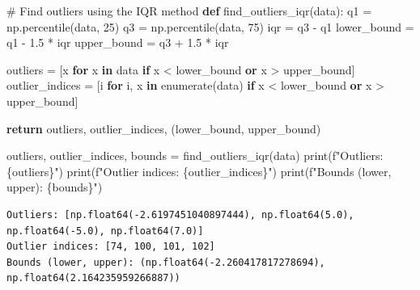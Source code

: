 \documentclass[
  letterpaper,
  DIV=11,
  numbers=noendperiod]{scrreprt}
\newenvironment{Shaded}{\begin{snugshade}}{\end{snugshade}}
\newcommand{\BuiltInTok}[1]{\textcolor[rgb]{0.00,0.23,0.31}{#1}}
\newcommand{\CommentTok}[1]{\textcolor[rgb]{0.37,0.37,0.37}{#1}}
\newcommand{\ControlFlowTok}[1]{\textcolor[rgb]{0.00,0.23,0.31}{\textbf{#1}}}
\newcommand{\DecValTok}[1]{\textcolor[rgb]{0.68,0.00,0.00}{#1}}
\newcommand{\FloatTok}[1]{\textcolor[rgb]{0.68,0.00,0.00}{#1}}
\newcommand{\KeywordTok}[1]{\textcolor[rgb]{0.00,0.23,0.31}{\textbf{#1}}}
\newcommand{\NormalTok}[1]{\textcolor[rgb]{0.00,0.23,0.31}{#1}}
\newcommand{\OperatorTok}[1]{\textcolor[rgb]{0.37,0.37,0.37}{#1}}
\newcommand{\SpecialCharTok}[1]{\textcolor[rgb]{0.37,0.37,0.37}{#1}}
\newcommand{\SpecialStringTok}[1]{\textcolor[rgb]{0.13,0.47,0.30}{#1}}
\begin{document}
\begin{Shaded}
\begin{Highlighting}[]
\CommentTok{\# Find outliers using the IQR method}
\KeywordTok{def}\NormalTok{ find\_outliers\_iqr(data):}
\NormalTok{    q1 }\OperatorTok{=}\NormalTok{ np.percentile(data, }\DecValTok{25}\NormalTok{)}
\NormalTok{    q3 }\OperatorTok{=}\NormalTok{ np.percentile(data, }\DecValTok{75}\NormalTok{)}
\NormalTok{    iqr }\OperatorTok{=}\NormalTok{ q3 }\OperatorTok{{-}}\NormalTok{ q1}
\NormalTok{    lower\_bound }\OperatorTok{=}\NormalTok{ q1 }\OperatorTok{{-}} \FloatTok{1.5} \OperatorTok{*}\NormalTok{ iqr}
\NormalTok{    upper\_bound }\OperatorTok{=}\NormalTok{ q3 }\OperatorTok{+} \FloatTok{1.5} \OperatorTok{*}\NormalTok{ iqr}
    
\NormalTok{    outliers }\OperatorTok{=}\NormalTok{ [x }\ControlFlowTok{for}\NormalTok{ x }\KeywordTok{in}\NormalTok{ data }\ControlFlowTok{if}\NormalTok{ x }\OperatorTok{\textless{}}\NormalTok{ lower\_bound }\KeywordTok{or}\NormalTok{ x }\OperatorTok{\textgreater{}}\NormalTok{ upper\_bound]}
\NormalTok{    outlier\_indices }\OperatorTok{=}\NormalTok{ [i }\ControlFlowTok{for}\NormalTok{ i, x }\KeywordTok{in} \BuiltInTok{enumerate}\NormalTok{(data) }\ControlFlowTok{if}\NormalTok{ x }\OperatorTok{\textless{}}\NormalTok{ lower\_bound }\KeywordTok{or}\NormalTok{ x }\OperatorTok{\textgreater{}}\NormalTok{ upper\_bound]}
    
    \ControlFlowTok{return}\NormalTok{ outliers, outlier\_indices, (lower\_bound, upper\_bound)}

\NormalTok{outliers, outlier\_indices, bounds }\OperatorTok{=}\NormalTok{ find\_outliers\_iqr(data)}
\BuiltInTok{print}\NormalTok{(}\SpecialStringTok{f"Outliers: }\SpecialCharTok{\{}\NormalTok{outliers}\SpecialCharTok{\}}\SpecialStringTok{"}\NormalTok{)}
\BuiltInTok{print}\NormalTok{(}\SpecialStringTok{f"Outlier indices: }\SpecialCharTok{\{}\NormalTok{outlier\_indices}\SpecialCharTok{\}}\SpecialStringTok{"}\NormalTok{)}
\BuiltInTok{print}\NormalTok{(}\SpecialStringTok{f"Bounds (lower, upper): }\SpecialCharTok{\{}\NormalTok{bounds}\SpecialCharTok{\}}\SpecialStringTok{"}\NormalTok{)}
\end{Highlighting}
\end{Shaded}

\begin{verbatim}
Outliers: [np.float64(-2.6197451040897444), np.float64(5.0), np.float64(-5.0), np.float64(7.0)]
Outlier indices: [74, 100, 101, 102]
Bounds (lower, upper): (np.float64(-2.260417817278694), np.float64(2.164235959266887))
\end{verbatim}
\end{document}

